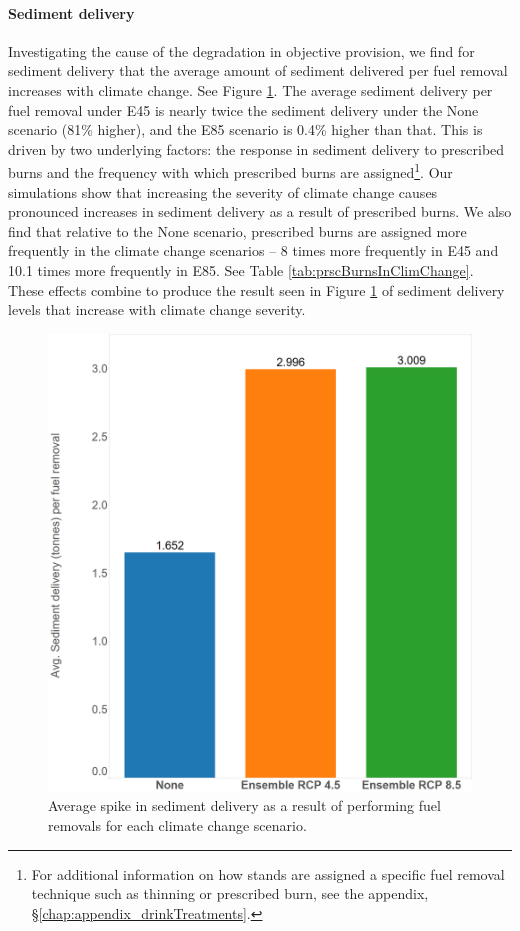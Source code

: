 \paragraph{Sediment delivery}
Investigating the cause of the degradation in objective provision, we find for sediment delivery that the average amount of sediment delivered per fuel removal increases with climate change. See Figure \ref{fig:avgSedimentDelivery}. The average sediment delivery per fuel removal under E45 is nearly twice the sediment delivery under the None scenario (81\% higher), and the E85 scenario is 0.4\% higher than that. This is driven by two underlying factors: the response in sediment delivery to prescribed burns and the frequency with which prescribed burns are assigned\footnote{For additional information on how stands are assigned a specific fuel removal technique such as thinning or prescribed burn, see the appendix, \S \ref{chap:appendix_drinkTreatments}.}. Our simulations show that increasing the severity of climate change causes pronounced increases in sediment delivery as a result of prescribed burns. We also find that relative to the None scenario, prescribed burns are assigned more frequently in the climate change scenarios -- 8 times more frequently in E45 and 10.1 times more frequently in E85. See Table \ref{tab:prscBurnsInClimChange}. These effects combine to produce the result seen in Figure \ref{fig:avgSedimentDelivery} of sediment delivery levels that increase with climate change severity.

\begin{figure}[ht]
\centering
\includegraphics[width=.55\textwidth]{../images/AvgSedimentSpikes}
\caption[Average sediment delivery across climate scenarios]{Average spike in sediment delivery as a result of performing fuel removals for each climate change scenario.}
\label{fig:avgSedimentDelivery}
\end{figure}

